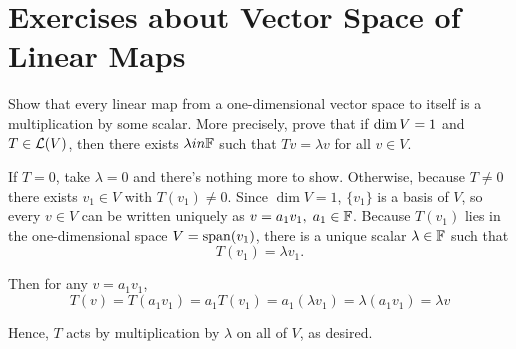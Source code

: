 \section*{Exercises about Vector Space of Linear Maps}

%

\begin{xrcs}
  Show that every linear map from a one-dimensional vector space to itself is a multiplication by some scalar. More precisely, prove that if $\operatorname{dim} V = 1$ and $T \in \mathcal{L} (V)$, then there exists $\lambda in \mathbb{F}$ such that $Tv = \lambda v$ for all $v \in V$.
  \begin{xprf}
    If $T = 0$, take $\lambda = 0$ and there's nothing more to show. Otherwise, because $T \neq 0$ there exists $v_1 \in V$ with $T(v_1) \neq 0$. Since $\dim V = 1$, $\{v_1\}$ is a basis of $V$, so every $v \in V$ can be written uniquely as $v=a_1 v_1, \; a_1 \in \mathbb{F}$. Because $T(v_1)$ lies in the one-dimensional space $V=\operatorname{span} (v_1)$, there is a unique scalar $\lambda \in \mathbb{F}$ such that
    \begin{equation}
      T(v_1) = \lambda v_1.
    \end{equation}

    Then for any $v = a_1 v_1$,
    \begin{equation}
      T(v) = T(a_1 v_1) = a_1 T(v_1) = a_1 (\lambda v_1) = \lambda (a_1 v_1) = \lambda v
    \end{equation}

    Hence, $T$ acts by multiplication by $\lambda$ on all of $V$, as desired.
  \end{xprf}
\end{xrcs}


